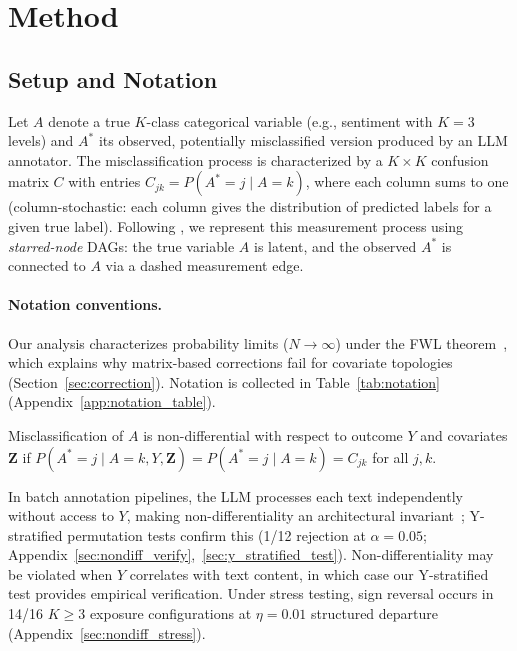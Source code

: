 \section{Method}
\label{sec:method}

\subsection{Setup and Notation}
\label{sec:notation}

Let $A$ denote a true $K$-class categorical variable (e.g., sentiment with $K{=}3$ levels) and $A^*$ its observed, potentially misclassified version produced by an LLM annotator. The misclassification process is characterized by a $K{\times}K$ confusion matrix $C$ with entries $C_{jk} = P(A^*{=}j \mid A{=}k)$, where each column sums to one (column-stochastic: each column gives the distribution of predicted labels for a given true label). Following \citet{hernan_cole2009}, we represent this measurement process using \emph{starred-node} DAGs: the true variable $A$ is latent, and the observed $A^*$ is connected to $A$ via a dashed measurement edge.

\paragraph{Notation conventions.}
Our analysis characterizes probability limits ($N \to \infty$) under the FWL theorem~\cite{frisch1933partial}, which explains why matrix-based corrections fail for covariate topologies (Section~\ref{sec:correction}). Notation is collected in Table~\ref{tab:notation} (Appendix~\ref{app:notation_table}).

\begin{definition}
\label{def:nondiff}
Misclassification of $A$ is non-differential with respect to outcome $Y$ and covariates $\mathbf{Z}$ if $P(A^*{=}j \mid A{=}k, Y, \mathbf{Z}) = P(A^*{=}j \mid A{=}k) = C_{jk}$ for all $j,k$.
\end{definition}

In batch annotation pipelines, the LLM processes each text independently without access to $Y$, making non-differentiality an architectural invariant~\cite{ziems2024can}; Y-stratified permutation tests confirm this (1/12 rejection at $\alpha{=}0.05$; Appendix~\ref{sec:nondiff_verify},~\ref{sec:y_stratified_test}). Non-differentiality may be violated when $Y$ correlates with text content, in which case our Y-stratified test provides empirical verification. Under stress testing, sign reversal occurs in 14/16 $K{\geq}3$ exposure configurations at $\eta{=}0.01$ structured departure (Appendix~\ref{sec:nondiff_stress}).

